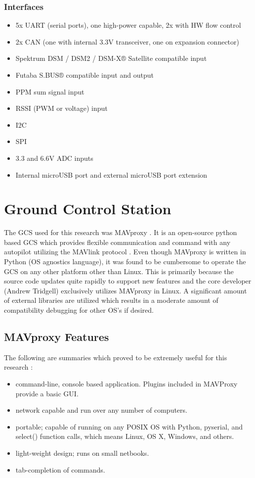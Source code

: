 \subsubsection{Interfaces}
\begin{itemize}
\item 5x UART (serial ports), one high-power capable, 2x with HW flow control
\item 2x CAN (one with internal 3.3V transceiver, one on expansion connector)
\item Spektrum DSM / DSM2 / DSM-X® Satellite compatible input
\item Futaba S.BUS® compatible input and output
\item PPM sum signal input
\item RSSI (PWM or voltage) input
\item I2C
\item SPI
\item 3.3 and 6.6V ADC inputs
\item Internal microUSB port and external microUSB port extension
\end{itemize}

\section{Ground Control Station}

The \ac{GCS} used for this research was MAVproxy \cite{mavproxy}.  It is an open-source python based \ac{GCS} which provides flexible communication and command with any autopilot utilizing the MAVlink protocol \cite{mavlink}.  Even though MAVproxy is written in Python (\ac{OS} agnostics language), it was found to be cumbersome to operate the \ac{GCS} on any other platform other than Linux.  This is primarily because the source code updates quite rapidly to support new features and the core developer (Andrew Tridgell) exclusively utilizes MAVproxy in Linux.  A significant amount of external libraries are utilized which results in a moderate amount of compatibility debugging for other \ac{OS}'s if desired.

\subsection{MAVproxy Features}
The following are summaries which proved to be extremely useful for this research \cite{mavproxy_wiki}:
\begin{itemize}
\item command-line, console based application. Plugins included in MAVProxy provide a basic \ac{GUI}.
\item network capable and run over any number of computers.
\item portable; capable of running on any POSIX OS with Python, pyserial, and select() function calls, which means Linux, OS X, Windows, and others.
\item light-weight design; runs on small netbooks.
\item tab-completion of commands.
\end{itemize}

